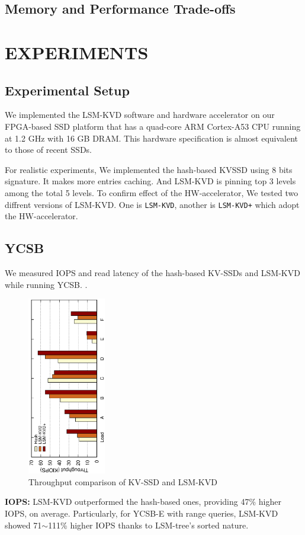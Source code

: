 \documentclass{abstract_hutech}
\newcommand{\ours}{LSM-KVD}
\begin{document}
\subsection{Memory and Performance Trade-offs}

\section{EXPERIMENTS}
\subsection{Experimental Setup}
We implemented the \ours{} software and hardware accelerator on our FPGA-based
SSD platform that has a quad-core ARM Cortex-A53 CPU running at 1.2 GHz with 16 GB
DRAM. This hardware specification is almost equivalent to those of recent SSDs.

For realistic experiments, We implemented the hash-based KVSSD using 8 bits signature. It makes more entries caching.
And \ours{} is pinning top 3 levels among the total 5 levels.
To confirm effect of the HW-accelerator, We tested two diffrent versions of \ours.
One is \texttt{LSM-KVD}, another is \texttt{LSM-KVD+} which adopt the HW-accelerator.

\subsection{YCSB}
We measured IOPS and read latency of the hash-based KV-SSDs and \ours{} while running YCSB.
.

\begin{figure}[h]
\centering
\includegraphics[width=3.4cm,angle=-90]{./exp/exp1/exp1.eps}
\caption{
Throughput comparison of KV-SSD and \ours{}
}
\label{fig:iops}
\vspace{-10pt}
\end{figure}
\textbf{IOPS:}
\ours{} outperformed the
hash-based ones, providing 47\% higher IOPS, on average. Particularly, for
YCSB-E with range queries, \ours{} showed 71$\sim$111\% higher IOPS thanks to
LSM-tree's sorted nature. 
\end{document}
